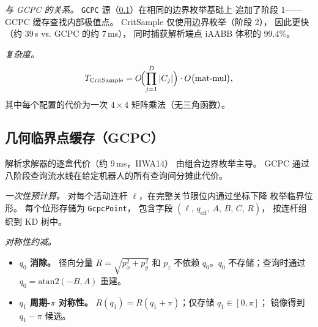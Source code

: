 \documentclass[journal]{IEEEtran}
\begin{document}
\emph{与 GCPC 的关系。}
\texttt{GCPC} 源（\cref{sec:gcpc}）在相同的边界枚举基础上
追加了阶段 1——GCPC 缓存查找内部极值点。
CritSample 仅使用边界枚举（阶段 2），
因此更快（约 39\,\textmu s vs.
GCPC 的约 7\,ms），
同时捕获解析端点 iAABB 体积的 99.4\%。

\emph{复杂度。}
\begin{equation}
  T_\text{CritSample}
  = O\!\Bigl(\prod_{j=1}^{D} |C_j|\Bigr)
  \cdot O\bigl(\text{mat-mul}\bigr),
\end{equation}
其中每个配置的代价为一次 $4{\times}4$ 矩阵乘法（无三角函数）。

\subsection{几何临界点缓存（GCPC）}\label{sec:gcpc}

解析求解器的逐盒代价（约 9\,ms，IIWA14）
由组合边界枚举主导。
GCPC 通过八阶段查询流水线在给定机器人的所有查询间分摊此代价。

\emph{一次性预计算。}
对每个活动连杆 $\ell$，在完整关节限位内通过坐标下降
枚举临界位形。
每个位形存储为 \texttt{GcpcPoint}，
包含字段 $(\ell,\, q_\text{eff},\, A,\, B,\, C,\, R)$，
按连杆组织到 KD 树中。

\emph{对称性约减。}
\begin{itemize}
  \item \textbf{$q_0$ 消除。}
    径向分量 $R = \sqrt{p_x^2 + p_y^2}$ 和 $p_z$
    不依赖 $q_0$。$q_0$ 不存储；查询时通过
    $q_0 = \mathrm{atan2}(-B, A)$ 重建。
  \item \textbf{$q_1$ 周期-$\pi$ 对称性。}
    $R(q_1) = R(q_1 + \pi)$；仅存储 $q_1 \in [0,\pi]$；
    镜像得到 $q_1 - \pi$ 候选。
\end{itemize}
\end{document}

